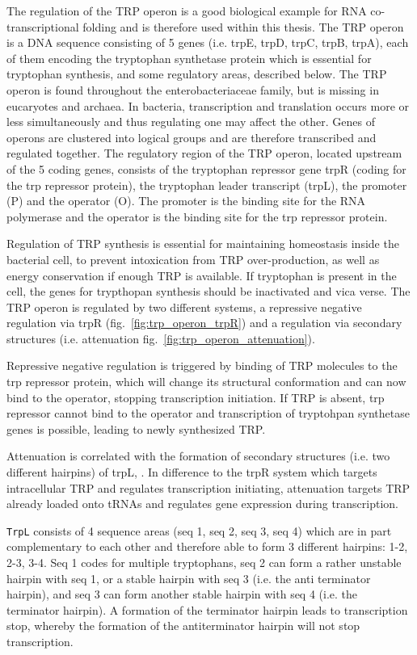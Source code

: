 \documentclass[ twoside,openright,titlepage,numbers=noenddot,headinclude,%
                footinclude=false, cleardoublepage=empty,abstractoff, %
                BCOR=5mm,paper=a4,fontsize=11pt,%
                ngerman,american,%
                ]{scrreprt}
\begin{document}
The regulation of the TRP operon is a good biological example for RNA co-transcriptional folding and is therefore used within this thesis.
The TRP operon is a DNA sequence consisting of 5 genes (i.e. trpE, trpD, trpC, trpB, trpA), each of them encoding the tryptophan synthetase protein which is essential for tryptophan synthesis, and some regulatory areas, described below.
The TRP operon is found throughout the enterobacteriaceae family, but is missing in
eucaryotes and archaea. In bacteria, transcription and translation occurs
more or less simultaneously and thus regulating one may affect the
other.
Genes of operons are clustered into logical groups and are therefore transcribed and regulated together.
The regulatory region of the TRP operon, located upstream of the 5 coding genes, consists of the tryptophan repressor gene trpR (coding for the trp repressor protein), the tryptophan leader transcript (trpL), the promoter (P) and the operator (O). The promoter is the binding site for the RNA polymerase and the operator is the binding site for the trp repressor protein.

Regulation of TRP synthesis is essential for maintaining homeostasis inside the bacterial cell, to prevent intoxication from TRP over-production, as well as energy conservation if enough TRP is available.
If tryptophan is present in the cell, the genes for trypthopan synthesis
should be inactivated and vica verse. 
The TRP operon is regulated by two different systems, a repressive negative regulation via trpR (fig.~\ref{fig:trp_operon_trpR}) and a regulation via secondary structures (i.e. attenuation fig.~\ref{fig:trp_operon_attenuation}). 

Repressive negative regulation is triggered by binding of TRP molecules to the trp repressor protein, which will change its structural conformation and can now bind to the operator, stopping transcription initiation. If TRP is absent, trp repressor cannot bind to the operator and transcription of tryptohpan synthetase genes is possible, leading to newly synthesized TRP.

Attenuation is correlated with the formation of secondary structures
(i.e. two different hairpins) of trpL\cite{Oxender1979},
\cite{Yanofsky1977}. In difference to the trpR system which targets
intracellular TRP and regulates transcription initiating, attenuation
targets TRP already loaded onto tRNAs and regulates gene expression during transcription.

\texttt{TrpL} consists of 4 sequence areas (seq 1, seq 2, seq 3, seq 4) which are in
part complementary to each other and therefore able to form 3 different hairpins: 1-2, 2-3, 3-4.
Seq 1 codes for multiple tryptophans, seq 2 can form a rather unstable hairpin with seq 1, or a stable hairpin with seq 3 (i.e. the anti terminator hairpin), and seq 3 can form another stable hairpin with seq 4 (i.e. the terminator hairpin).
A formation of the terminator hairpin leads to transcription stop, whereby the formation of the antiterminator hairpin will not stop transcription. 
\end{document}
